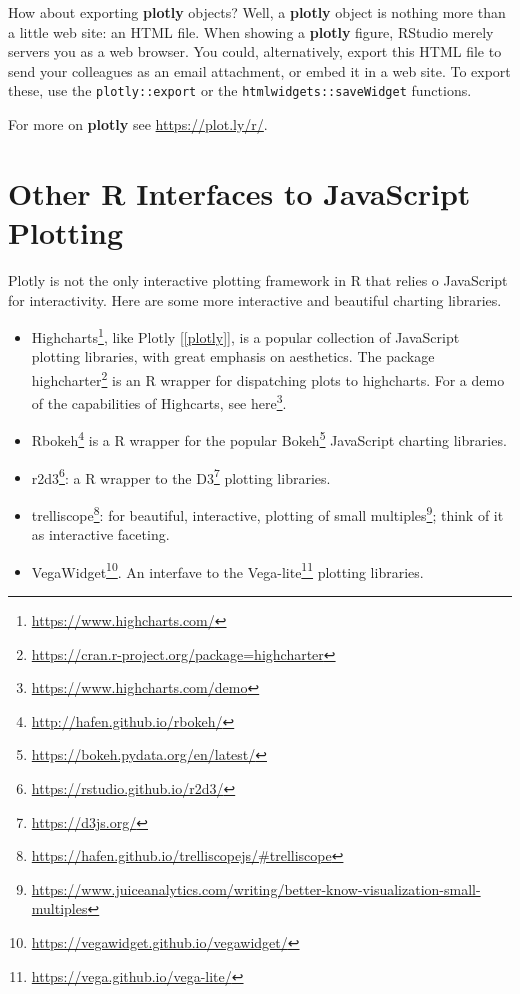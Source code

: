 \documentclass[]{book}
\renewcommand{\href}[2]{#2\footnote{\url{#1}}}
\theoremstyle{definition}
\theoremstyle{definition}
\theoremstyle{definition}
\theoremstyle{remark}
\begin{document}
\hypertarget{htmlwidget-abd5ef66e818cfb51399}{}

How about exporting \textbf{plotly} objects?
Well, a \textbf{plotly} object is nothing more than a little web site: an HTML file.
When showing a \textbf{plotly} figure, RStudio merely servers you as a web browser.
You could, alternatively, export this HTML file to send your colleagues as an email attachment, or embed it in a web site.
To export these, use the \texttt{plotly::export} or the \texttt{htmlwidgets::saveWidget} functions.

For more on \textbf{plotly} see \url{https://plot.ly/r/}.

\hypertarget{other-r-interfaces-to-javascript-plotting}{%
\section{Other R Interfaces to JavaScript Plotting}\label{other-r-interfaces-to-javascript-plotting}}

Plotly is not the only interactive plotting framework in R that relies o JavaScript for interactivity.
Here are some more interactive and beautiful charting libraries.

\begin{itemize}
\item
  \href{https://www.highcharts.com/}{Highcharts}, like Plotly {[}\ref{plotly}{]}, is a popular collection of JavaScript plotting libraries, with great emphasis on aesthetics.
  The package \href{https://cran.r-project.org/package=highcharter}{highcharter} is an R wrapper for dispatching plots to highcharts.
  For a demo of the capabilities of Highcarts, see \href{https://www.highcharts.com/demo}{here}.
\item
  \href{http://hafen.github.io/rbokeh/}{Rbokeh} is a R wrapper for the popular \href{https://bokeh.pydata.org/en/latest/}{Bokeh} JavaScript charting libraries.
\item
  \href{https://rstudio.github.io/r2d3/}{r2d3}: a R wrapper to the \href{https://d3js.org/}{D3} plotting libraries.
\item
  \href{https://hafen.github.io/trelliscopejs/\#trelliscope}{trelliscope}: for beautiful, interactive, plotting of \href{https://www.juiceanalytics.com/writing/better-know-visualization-small-multiples}{small multiples}; think of it as interactive faceting.
\item
  \href{https://vegawidget.github.io/vegawidget/}{VegaWidget}. An interfave to the \href{https://vega.github.io/vega-lite/}{Vega-lite} plotting libraries.
\end{itemize}
\end{document}
